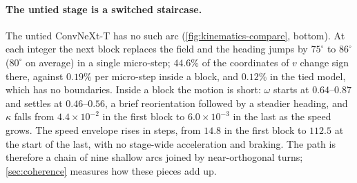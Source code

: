 \paragraph{The untied stage is a switched staircase.}
The untied ConvNeXt-T has no such arc (\cref{fig:kinematics-compare}, bottom).
At each integer the next block replaces the field and the heading jumps by
$75^\circ$ to $86^\circ$ ($80^\circ$ on average) in a single micro-step;
$44.6\%$ of the coordinates of $v$ change sign there, against $0.19\%$ per micro-step
inside a block, and $0.12\%$ in the tied model, which has no boundaries.
Inside a block the motion is short: $\omega$ starts at $0.64$--$0.87$ and settles at
$0.46$--$0.56$, a brief reorientation followed by a steadier heading, and $\kappa$
falls from $4.4{\times}10^{-2}$ in the first block to $6.0{\times}10^{-3}$ in the last
as the speed grows.
The speed envelope rises in steps, from $14.8$ in the first block to $112.5$ at the
start of the last, with no stage-wide acceleration and braking.
The path is therefore a chain of nine shallow arcs joined by near-orthogonal turns;
\cref{sec:coherence} measures how these pieces add up.
